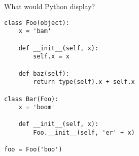 \begin{blocksection}
\question What would Python display?

\begin{lstlisting}
class Foo(object):
    x = 'bam'

    def __init__(self, x):
        self.x = x

    def baz(self):
        return type(self).x + self.x

class Bar(Foo):
    x = 'boom'

    def __init__(self, x):
        Foo.__init__(self, 'er' + x)

foo = Foo('boo')
\end{lstlisting}   

\end{blocksection}
